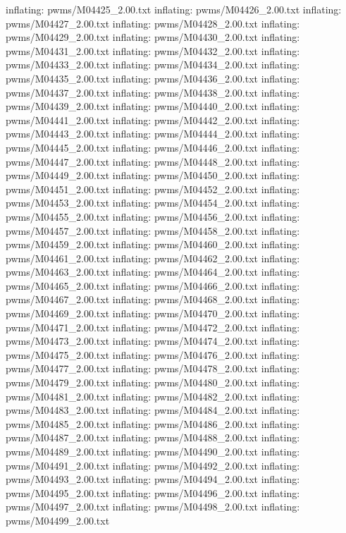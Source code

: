 \documentclass[letterpaper,10pt,english]{sphinxmanual}
\begin{document}
{\begin{sphinxVerbatim}[commandchars=\\\{\}]
  inflating: pwms/M04425\_2.00.txt
  inflating: pwms/M04426\_2.00.txt
  inflating: pwms/M04427\_2.00.txt
  inflating: pwms/M04428\_2.00.txt
  inflating: pwms/M04429\_2.00.txt
  inflating: pwms/M04430\_2.00.txt
  inflating: pwms/M04431\_2.00.txt
  inflating: pwms/M04432\_2.00.txt
  inflating: pwms/M04433\_2.00.txt
  inflating: pwms/M04434\_2.00.txt
  inflating: pwms/M04435\_2.00.txt
  inflating: pwms/M04436\_2.00.txt
  inflating: pwms/M04437\_2.00.txt
  inflating: pwms/M04438\_2.00.txt
  inflating: pwms/M04439\_2.00.txt
  inflating: pwms/M04440\_2.00.txt
  inflating: pwms/M04441\_2.00.txt
  inflating: pwms/M04442\_2.00.txt
  inflating: pwms/M04443\_2.00.txt
  inflating: pwms/M04444\_2.00.txt
  inflating: pwms/M04445\_2.00.txt
  inflating: pwms/M04446\_2.00.txt
  inflating: pwms/M04447\_2.00.txt
  inflating: pwms/M04448\_2.00.txt
  inflating: pwms/M04449\_2.00.txt
  inflating: pwms/M04450\_2.00.txt
  inflating: pwms/M04451\_2.00.txt
  inflating: pwms/M04452\_2.00.txt
  inflating: pwms/M04453\_2.00.txt
  inflating: pwms/M04454\_2.00.txt
  inflating: pwms/M04455\_2.00.txt
  inflating: pwms/M04456\_2.00.txt
  inflating: pwms/M04457\_2.00.txt
  inflating: pwms/M04458\_2.00.txt
  inflating: pwms/M04459\_2.00.txt
  inflating: pwms/M04460\_2.00.txt
  inflating: pwms/M04461\_2.00.txt
  inflating: pwms/M04462\_2.00.txt
  inflating: pwms/M04463\_2.00.txt
  inflating: pwms/M04464\_2.00.txt
  inflating: pwms/M04465\_2.00.txt
  inflating: pwms/M04466\_2.00.txt
  inflating: pwms/M04467\_2.00.txt
  inflating: pwms/M04468\_2.00.txt
  inflating: pwms/M04469\_2.00.txt
  inflating: pwms/M04470\_2.00.txt
  inflating: pwms/M04471\_2.00.txt
  inflating: pwms/M04472\_2.00.txt
  inflating: pwms/M04473\_2.00.txt
  inflating: pwms/M04474\_2.00.txt
  inflating: pwms/M04475\_2.00.txt
  inflating: pwms/M04476\_2.00.txt
  inflating: pwms/M04477\_2.00.txt
  inflating: pwms/M04478\_2.00.txt
  inflating: pwms/M04479\_2.00.txt
  inflating: pwms/M04480\_2.00.txt
  inflating: pwms/M04481\_2.00.txt
  inflating: pwms/M04482\_2.00.txt
  inflating: pwms/M04483\_2.00.txt
  inflating: pwms/M04484\_2.00.txt
  inflating: pwms/M04485\_2.00.txt
  inflating: pwms/M04486\_2.00.txt
  inflating: pwms/M04487\_2.00.txt
  inflating: pwms/M04488\_2.00.txt
  inflating: pwms/M04489\_2.00.txt
  inflating: pwms/M04490\_2.00.txt
  inflating: pwms/M04491\_2.00.txt
  inflating: pwms/M04492\_2.00.txt
  inflating: pwms/M04493\_2.00.txt
  inflating: pwms/M04494\_2.00.txt
  inflating: pwms/M04495\_2.00.txt
  inflating: pwms/M04496\_2.00.txt
  inflating: pwms/M04497\_2.00.txt
  inflating: pwms/M04498\_2.00.txt
  inflating: pwms/M04499\_2.00.txt

\end{sphinxVerbatim}}
\end{document}
